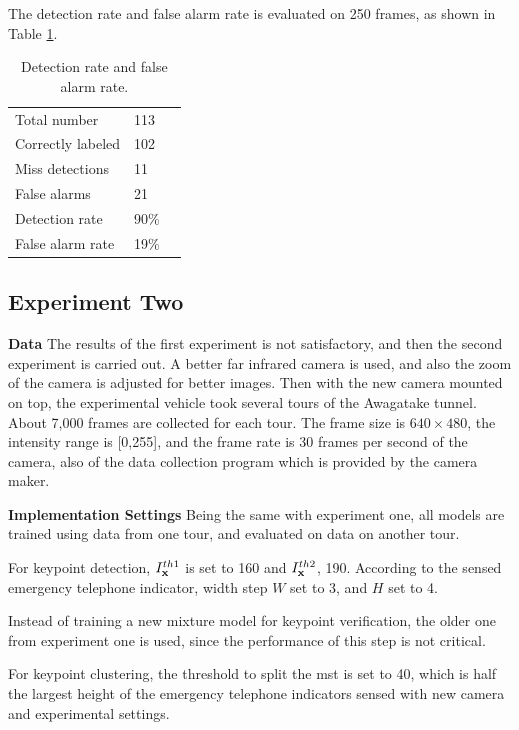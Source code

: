 The detection rate and false alarm rate is evaluated on 250 frames, as shown in Table \ref{ex1:tb2}.

\begin{table}[h]
\centering
\begin{tabular}{lll}
     \hline
     \hline
    Total number &	113   \\
    Correctly labeled &	102   \\
    Miss detections &	11 &	  \\
    False alarms &	21    \\
    Detection rate &	90\% &	  \\
    False alarm rate &	19\% &	   \\
   \hline
\end{tabular}
\caption[Detection rate and false alarm rate]{Detection rate and false alarm rate.}\label{ex1:tb2}
\end{table}

\subsection{Experiment Two}



\textbf{Data} The results of the first experiment is not satisfactory, and then the second experiment is carried out. A better far infrared camera is used, and also the zoom of the camera is adjusted for better images. Then with the new camera mounted on top, the experimental vehicle took several tours of the Awagatake tunnel. About 7,000 frames are collected for each tour. The frame size is $640\times 480$, the intensity range is [0,255], and the frame rate is 30 frames per second of the camera, also of the data collection program which is provided by the camera maker.

\textbf{Implementation Settings} Being the same with experiment one, all models are trained using data from one tour, and evaluated on data on another tour.

 For keypoint detection, $I^{th1}_{\bf{x}}$ is set to 160 and $I^{th2}_{\bf{x}}$, 190. According to the sensed emergency telephone indicator, width step $W$ set to 3, and $H$ set to 4.

Instead of training a new mixture model for keypoint verification, the older one from experiment one is used, since the performance of this step is not critical.

For keypoint clustering, the threshold to split the mst is set to 40, which is half the largest height of the emergency telephone indicators sensed with new camera and experimental settings.


